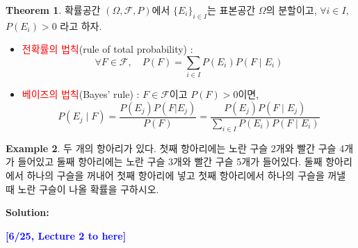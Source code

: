 \documentclass{article}
\theoremstyle{definition}
\newtheorem{theorem}{Theorem}
\newtheorem{example}[theorem]{Example}
\begin{document}
\begin{theorem}
    확률공간 $(\Omega, \mathcal{F}, P)$에서 $\{E_i\}_{i \in I}$는 표본공간 $\Omega$의 분할이고, $\forall i \in I$, $P(E_i) > 0$ 라고 하자.
    \begin{itemize}
        \item \textcolor{red}{전확률의 법칙}(rule of total probability) :
        \[
        \forall F \in \mathcal{F}, \quad P(F) = \sum_{i \in I} P(E_i) P(F \mid E_i)
        \]
        \item \textcolor{red}{베이즈의 법칙}(Bayes' rule) : $F \in \mathcal{F}$이고 $P(F) > 0$이면,
        \[
        P(E_j \mid F) = \frac{P(E_j) P(F|E_j)}{P(F)}= \frac{P(E_j) P(F \mid E_j)}{\sum_{i \in I} P(E_i) P(F \mid E_i)}
        \]
    \end{itemize}
\end{theorem}

\begin{example}
    두 개의 항아리가 있다. 첫째 항아리에는 노란 구슬 2개와 빨간 구슬 4개가 들어있고 둘째 항아리에는 노란 구슬 3개와 빨간 구슬 5개가 들어있다. 둘째 항아리에서 하나의 구슬을 꺼내어 첫째 항아리에 넣고 첫째 항아리에서 하나의 구슬을 꺼낼 때 노란 구슬이 나올 확률을 구하시오.
\end{example}

\noindent
\textbf{Solution:}

\noindent
\textcolor{blue}{\textbf{[6/25, Lecture 2 to here]}}
\end{document}
